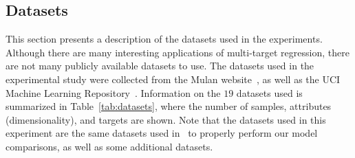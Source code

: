 \documentclass[preprint,12pt]{elsarticle}
\begin{document}
\subsection{Datasets}\label{subsec:data}
This section presents a description of the datasets used in the experiments. Although there are many interesting applications of multi-target regression, there are not many publicly available datasets to use. The datasets used in the experimental study were collected from the Mulan website~\cite{mulan}, as well as the UCI Machine Learning Repository~\cite{Lichman:2013}. Information on the $19$ datasets used is summarized in Table~\ref{tab:datasets}, where the number of samples, attributes (dimensionality), and targets are shown. Note that the datasets used in this experiment are the same datasets used in~\cite{Spyromitros2014} to properly perform our model comparisons, as well as some additional datasets. 
\end{document}
